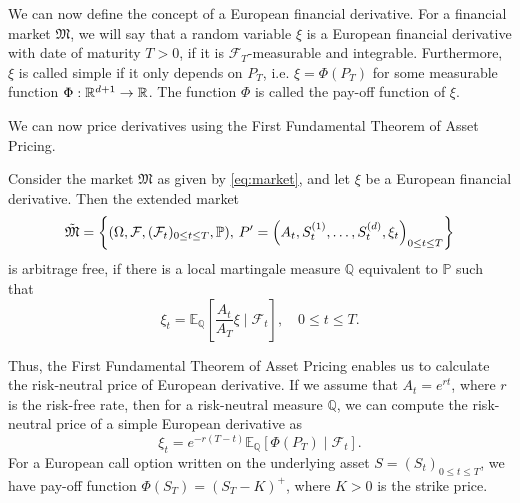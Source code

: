We can now define the concept of a European financial derivative. For a financial market $\mathfrak{M}$, we will say that a random variable $\xi$ is a European financial derivative with date of maturity $T>0$, if it is $\mathcal{F}_{T}$-measurable and integrable. Furthermore, $\xi$ is called simple if it only depends on $P_T$, i.e. $\xi=\Phi(P_T)$ for some measurable function $\Phi:\mathbb{R}^{d+1}\to \mathbb{R}$. The function $\Phi$ is called the pay-off function of $\xi$.

We can now price derivatives using the First Fundamental Theorem of Asset Pricing.
\begin{cor}
Consider the market $\mathfrak{M}$ as given by \eqref{eq:market}, and let $\xi$ be a European financial derivative. Then the extended market
\begin{equation}
    \Tilde{\mathfrak{M}}=\left\{\left(\Omega,\mathcal{F},(\mathcal{F}_{t})_{0\leq t\leq T}, \mathbb{P}\right),\hspace{2 pt} P'=\left(A_{t},S_{t}^{(1)},\dots,S_{t}^{(d)}, \xi_{t}\right)_{0\leq t\leq T}\right\}
\end{equation}
is arbitrage free, if there is a local martingale measure $\mathbb{Q}$ equivalent to $\mathbb{P}$ such that
\begin{equation}
    \xi_{t}=\mathbb{E}_{\mathbb{Q}}\left[\frac{A_t}{A_T}\xi\mid \mathcal{F}_{t}\right],\quad 0\leq t\leq T.
\end{equation}
\end{cor}
Thus, the First Fundamental Theorem of Asset Pricing enables us to calculate the risk-neutral price of European derivative. If we assume that $A_{t}=e^{rt}$, where $r$ is the risk-free rate, then for a risk-neutral measure $\mathbb{Q}$, we can compute the risk-neutral price of a simple European derivative as
\begin{equation}
    \xi_{t}=e^{-r(T-t)}\mathbb{E}_{\mathbb{Q}}[\Phi(P_{T})\mid \mathcal{F}_{t}].
\end{equation}
For a European call option written on the underlying asset $S=(S_{t})_{0\leq t\leq T}$, we have pay-off function $\Phi(S_{T})=(S_{T}-K)^{+}$, where $K>0$ is the strike price.
